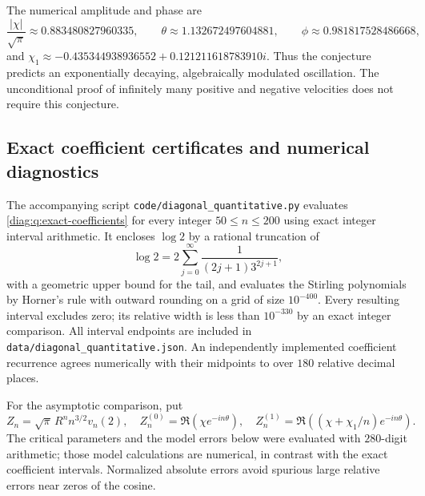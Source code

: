 The numerical amplitude and phase are
\[
 \frac{|\chi|}{\sqrt\pi}\approx0.883480827960335,
 \qquad \theta\approx1.132672497604881,
 \qquad \phi\approx0.981817528486668,
\]
and
$\chi_1\approx-0.435344938936552+0.121211618783910i$.
Thus the conjecture predicts an exponentially decaying, algebraically
modulated oscillation.  The unconditional proof of infinitely many
positive and negative velocities does not require this conjecture.

\subsection{Exact coefficient certificates and numerical diagnostics}
\label{diag:q:diagnostics-subsection}

The accompanying script \nolinkurl{code/diagonal_quantitative.py}
evaluates \eqref{diag:q:exact-coefficients} for every integer
$50\leq n\leq200$ using exact integer interval arithmetic.  It encloses
$\log2$ by a rational truncation of
\[
 \log2=2\sum_{j=0}^{\infty}\frac1{(2j+1)3^{2j+1}},
\]
with a geometric upper bound for the tail, and evaluates the Stirling
polynomials by Horner's rule with outward rounding on a grid of size
$10^{-400}$.  Every resulting interval excludes zero; its relative width
is less than $10^{-330}$ by an exact integer comparison.  All interval
endpoints are included in \nolinkurl{data/diagonal_quantitative.json}.
An independently implemented coefficient recurrence agrees numerically
with their midpoints to over $180$ relative decimal places.

For the asymptotic comparison, put
\[
 Z_n=\sqrt\pi\,R^n n^{3/2}v_n(2),\quad
 Z_n^{(0)}=\Re(\chi e^{-in\theta}),\quad
 Z_n^{(1)}=\Re((\chi+\chi_1/n)e^{-in\theta}).
\]
The critical parameters and the model errors below were evaluated with
$280$-digit arithmetic; those model calculations are numerical, in
contrast with the exact coefficient intervals.  Normalized absolute
errors avoid spurious large relative errors near zeros of the cosine.


